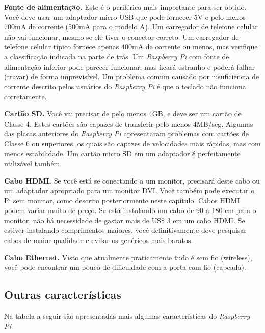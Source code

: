 \textbf{Fonte de alimentação.} Este é o periférico mais importante para ser obtido. Você deve usar um adaptador micro USB que pode fornecer 5V e pelo menos 700mA de corrente (500mA para o modelo A). Um carregador de telefone celular não vai funcionar, mesmo se ele tiver o conector correto. Um carregador de telefone celular típico fornece apenas 400mA de corrente ou menos, mas verifique a classificação indicada na parte de trás. Um \textit{Raspberry Pi} com fonte de alimentação inferior pode parecer funcionar, mas ficará estranho e poderá falhar (travar) de forma imprevisível. Um problema comum causado por insuficiência de corrente descrito pelos usuários do \textit{Raspberry Pi} é que o teclado não funciona corretamente.

\textbf{Cartão SD.} Você vai precisar de pelo menos 4GB, e deve ser um cartão de Classe 4. Estes cartões são capazes de transferir pelo menos 4MB/seg. Algumas das placas anteriores do \textit{Raspberry Pi} apresentaram problemas com cartões de Classe 6 ou superiores, os quais são capazes de velocidades mais rápidas, mas com menos estabilidade. Um cartão micro SD em um adaptador é perfeitamente utilizável também.

\textbf{Cabo HDMI.} Se você está se conectando a um monitor, precisará deste cabo ou um adaptador apropriado para um monitor DVI. Você também pode executar o Pi sem monitor, como descrito posteriormente neste capítulo. Cabos HDMI podem variar muito de preço. Se está instalando um cabo de 90 a 180 cm para o monitor, não há necessidade de gastar mais de US\$ 3 em um cabo HDMI. Se estiver instalando comprimentos maiores, você definitivamente deve pesquisar cabos de maior qualidade e evitar os genéricos mais baratos.

\textbf{Cabo Ethernet.} Visto que atualmente praticamente tudo é sem fio (wireless), você pode encontrar um pouco de dificuldade com a porta com fio (cabeada).

\subsection{Outras características}

Na tabela a seguir são apresentadas mais algumas características do \textit{Raspberry Pi}.

